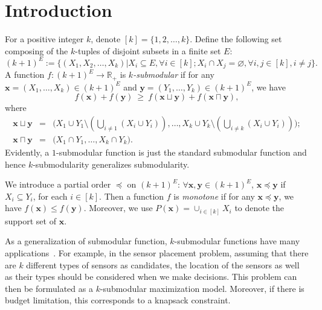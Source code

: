 \documentclass[preprint,12pt]{elsarticle}
\def\bx{\boldsymbol{x}}
\def\by{\boldsymbol{y}}
\begin{document}





\section{Introduction}
For a positive integer $k$, denote $[k]=\{1,2,\ldots,k\}$. Define the following set composing of the $k$-tuples of disjoint subsets in a finite set $E$:
\[
(k+1)^E:=\{(X_1,X_2,\ldots,X_k)|X_i\subseteq E, \forall i\in [k]; X_i\cap X_j=\varnothing, \forall i,j\in [k], i\neq j\}.
\]
A function $f:(k+1)^E\rightarrow \mathbb{R}_+$ is \emph{$k$-submodular} if for any $\bx=(X_1,\dots, X_k)\in (k+1)^E$ and $\by=(Y_1,\dots, Y_k)\in (k+1)^E$, we have
\[ f(\bx)+f(\by) \ \ge \ f(\bx\sqcup\by)+f(\bx\sqcap\by), \]
where
\begin{eqnarray*}
\bx\sqcup\by&=&\bigg(X_1\cup Y_1\setminus(\bigcup_{i\ne 1}(X_i\cup Y_i)), \dots,X_k\cup Y_k\setminus(\bigcup_{i\ne k}(X_i\cup Y_i))\bigg);\\
\bx\sqcap\by&=&\bigg(X_1\cap Y_1, \dots, X_k\cap Y_k\bigg).
\end{eqnarray*}
Evidently,  a $1$-submodular function is just the standard submodular function and hence $k$-submodularity generalizes submodularity.


We introduce a partial order $\preceq$ on $(k+1)^E$: $\forall \bx, \by\in (k+1)^E$, $\bx \preceq \by$ if $X_i\subseteq Y_i$, for each $i\in [k]$. Then a function $f$ is \emph{monotone} if for any $\bx \preceq \by$, we have
$f(\bx)\leq f(\by)$. Moreover, we use $P(\bx)=\cup_{i\in [k]}X_i$ to denote the support set of $\bx$.

As a generalization of submodular function, $k$-submodular functions have many applications~\cite{EN2022,AV,TN}.
For example, in the sensor placement problem, assuming that there are $k$ different types of sensors as candidates, the location of the sensors as well as their types should be considered when we make decisions.
This problem can then be formulated as a $k$-submodular maximization model.
Moreover, if there is budget limitation, this corresponds to a knapsack constraint.
\end{document}
